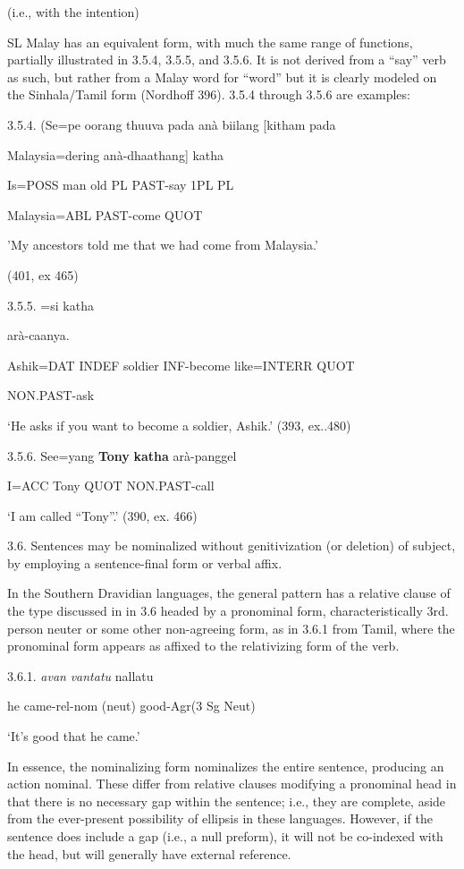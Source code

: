 \documentclass[letterpaper]{article}
\begin{document}
    (i.e., with the  intention)

 SL Malay has an equivalent form, with much the same range of functions, partially illustrated in 3.5.4, 3.5.5, and 3.5.6. It is not derived from a ``say'' verb as such, but rather from a Malay word for ``word'' but it is clearly modeled on the Sinhala/Tamil form  (Nordhoff 396). 3.5.4 through 3.5.6 are examples:

3.5.4. 
\ea
\gll  (Se=pe oorang thuuva pada anà biilang [kitham pada

   Malaysia=dering anà-dhaathang] katha

Is=POSS man old PL PAST-say  1PL    PL 

Malaysia=ABL PAST-come QUOT  

'My ancestors told me that we had come from Malaysia.'

 (401, ex 465)

3.5.5.
\ea
\gll  [Aashik=nang hathu soldier mà-jaadi sukka]=si katha 

 arà-caanya. 

 Ashik=DAT INDEF soldier INF-become like=INTERR QUOT

 NON.PAST-ask

 `He asks if you want to become a soldier, Ashik.' (393, ex..480)

3.5.6.
\ea
\gll   See=yang \textbf{Tony} \textbf{katha} arà-panggel

 I=ACC  Tony   QUOT  NON.PAST-call

 `I am called ``Tony''.'  (390, ex. 466)

3.6. Sentences may be nominalized without genitivization (or deletion) of subject, by employing a sentence-final form or verbal affix.

In the Southern Dravidian languages, the general pattern has a relative clause of the type discussed in in 3.6 headed by a pronominal form, characteristically 3rd. person neuter or some other non-agreeing form, as in 3.6.1 from Tamil, where the pronominal form appears as affixed to the relativizing form of the verb.

 3.6.1.
\ea
\gll  \textit{avan} \textit{vantatu}  nallatu

  he  came-rel-nom (neut) good-Agr(3 Sg Neut)

  `It's good that he came.'

 In essence, the nominalizing form nominalizes the entire sentence, producing an action nominal. These differ from relative clauses modifying a pronominal head in that there is no necessary gap within the sentence; i.e., they are complete, aside from the ever-present possibility of ellipsis in these languages. However, if the sentence does include a gap (i.e., a null preform), it will not be co-indexed with the head, but will generally have external reference.
\end{document}
